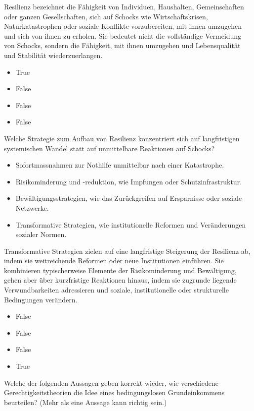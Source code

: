 \documentclass[
  nswissgerman,
  a4paper,
  DIV=11,
  numbers=noendperiod,
  oneside,
  openany]{scrreprt}
\providecommand{\tightlist}{%
  \setlength{\itemsep}{0pt}\setlength{\parskip}{0pt}}
\begin{document}
Resilienz bezeichnet die Fähigkeit von Individuen, Haushalten,
Gemeinschaften oder ganzen Gesellschaften, sich auf Schocks wie
Wirtschaftskrisen, Naturkatastrophen oder soziale Konflikte
vorzubereiten, mit ihnen umzugehen und sich von ihnen zu erholen. Sie
bedeutet nicht die vollständige Vermeidung von Schocks, sondern die
Fähigkeit, mit ihnen umzugehen und Lebensqualität und Stabilität
wiederzuerlangen.

\begin{itemize}
\tightlist
\item
  True
\item
  False
\item
  False
\item
  False
\end{itemize}

Welche Strategie zum Aufbau von Resilienz konzentriert sich auf
langfristigen systemischen Wandel statt auf unmittelbare Reaktionen auf
Schocks?

\begin{itemize}
\tightlist
\item[$\square$]
  Sofortmassnahmen zur Nothilfe unmittelbar nach einer Katastrophe.
\item[$\square$]
  Risikominderung und -reduktion, wie Impfungen oder
  Schutzinfrastruktur.
\item[$\square$]
  Bewältigungsstrategien, wie das Zurückgreifen auf Ersparnisse oder
  soziale Netzwerke.
\item[$\square$]
  Transformative Strategien, wie institutionelle Reformen und
  Veränderungen sozialer Normen.
\end{itemize}

Transformative Strategien zielen auf eine langfristige Steigerung der
Resilienz ab, indem sie weitreichende Reformen oder neue Institutionen
einführen. Sie kombinieren typischerweise Elemente der Risikominderung
und Bewältigung, gehen aber über kurzfristige Reaktionen hinaus, indem
sie zugrunde liegende Verwundbarkeiten adressieren und soziale,
institutionelle oder strukturelle Bedingungen verändern.

\begin{itemize}
\tightlist
\item
  False
\item
  False
\item
  False
\item
  True
\end{itemize}

Welche der folgenden Aussagen geben korrekt wieder, wie verschiedene
Gerechtigkeitstheorien die Idee eines bedingungslosen Grundeinkommens
beurteilen? (Mehr als eine Aussage kann richtig sein.)
\end{document}
